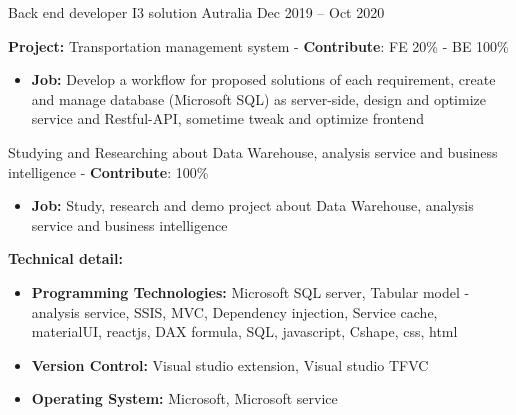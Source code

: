 \begin{cventries}
  \cventry
    {Back end developer} %
    {I3 solution Autralia} %
    {} %
    {Dec 2019 – Oct 2020 } %
    {
      \begin{cvitems} %
        \item {\textbf{Project:} Transportation management system - \textbf{Contribute}: FE 20\% - BE 100\%}
        \begin{itemize}
            \item {\textbf{Job:} Develop a workflow for proposed solutions of each requirement, create and manage database (Microsoft SQL)  as server-side, design and optimize service and Restful-API, sometime tweak and optimize frontend}
        \end{itemize}
        \item {Studying and Researching about Data Warehouse, analysis service and business intelligence - \textbf{Contribute}: 100\%}
        \begin{itemize}
            \item {\textbf{Job:} Study, research and demo project about Data Warehouse, analysis service and business intelligence}
        \end{itemize}
        \item {\textbf{Technical detail:}}
        \begin{itemize}
            \item {\textbf{Programming Technologies:} Microsoft SQL server, Tabular model - analysis service, SSIS, MVC, Dependency injection, Service cache, materialUI, reactjs, DAX formula, SQL, javascript, Cshape, css, html}
            \item {\textbf{Version Control:} Visual studio extension, Visual studio TFVC}
            \item {\textbf{Operating System:} Microsoft, Microsoft service}
        \end{itemize}
      \end{cvitems}
    }


\end{cventries}
